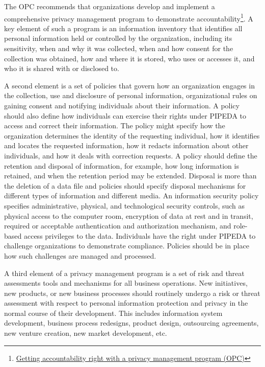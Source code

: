 The OPC recommends that organizations develop and implement a comprehensive privacy management program to demonstrate accountability\footnote{\href{https://www.priv.gc.ca/en/privacy-topics/privacy-laws-in-canada/the-personal-information-protection-and-electronic-documents-act-pipeda/pipeda-compliance-help/pipeda-compliance-and-training-tools/gl_acc_201204/}{Getting accountability right with a privacy management program (OPC)}}. A key element of such a program is an information inventory that identifies all personal information held or controlled by the organization, including its sensitivity, when and why it was collected, when and how consent for the collection was obtained, how and where it is stored, who uses or accesses it, and who it is shared with or disclosed to.

A second element is a set of policies that govern how an organization engages in the collection, use and disclosure of personal information, organizational rules on gaining consent and notifying individuals about their information. A policy should also define how individuals can exercise their rights under PIPEDA to access and correct their information. The policy might specify how the organization determines the identity of the requesting individual, how it identifies and locates the requested information, how it redacts information about other individuals, and how it deals with correction requests. A policy should define the retention and disposal of information, for example, how long information is retained, and when the retention period may be extended. Disposal is more than the deletion of a data file and policies should specify disposal mechanisms for different types of information and different media. An information security policy specifies administrative, physical, and technological security controls, such as physical access to the computer room, encryption of data at rest and in transit, required or acceptable authentication and authorization mechanism, and role-based access privileges to the data. Individuals have the right under PIPEDA to challenge organizations to demonstrate compliance. Policies should be in place how such challenges are managed and processed.

A third element of a privacy management program is a set of risk and threat assessments tools and mechanisms for all business operations. New initiatives, new products, or new business processes should routinely undergo a risk or threat assessment with respect to personal information protection and privacy in the normal course of their development. This includes information system development, business process redesigns, product design, outsourcing agreements, new venture creation, new market development, etc. 

